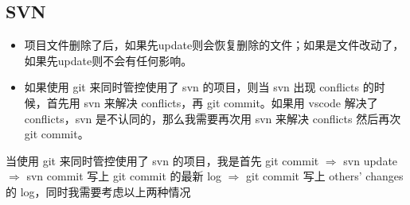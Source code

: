 \documentclass[a4paper, 12pt]{article}
\begin{document}
\subsection{SVN}
\begin{itemize}
\item 项目文件删除了后，如果先update则会恢复删除的文件；如果是文件改动了，如果先update则不会有任何影响。

\item 如果使用 git 来同时管控使用了 svn 的项目，则当 svn 出现 conflicts 的时候，首先用 svn 来解决 conflicts，再 git commit。如果用 vscode 解决了 conflicts，svn 是不认同的，那么我需要再次用 svn 来解决 conflicts 然后再次 git commit。

\end{itemize}

当使用 git 来同时管控使用了 svn 的项目，我是首先 git commit $\Rightarrow$ svn update $\Rightarrow$ svn commit 写上 git commit 的最新 log $\Rightarrow$ git commit 写上 others' changes 的 log，{\color{red}同时}我需要考虑以上两种情况
\end{document}
